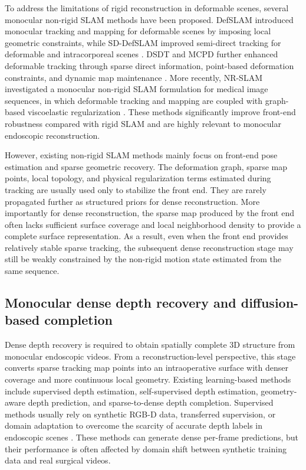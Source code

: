 \documentclass[pdflatex,sn-mathphys-num]{sn-jnl}
\begin{document}
To address the limitations of rigid reconstruction in deformable scenes, several monocular non-rigid SLAM methods have been proposed. DefSLAM introduced monocular tracking and mapping for deformable scenes by imposing local geometric constraints, while SD-DefSLAM improved semi-direct tracking for deformable and intracorporeal scenes \cite{bib5,bib6}. DSDT and MCPD further enhanced deformable tracking through sparse direct information, point-based deformation constraints, and dynamic map maintenance \cite{bib7,bib8}. More recently, NR-SLAM investigated a monocular non-rigid SLAM formulation for medical image sequences, in which deformable tracking and mapping are coupled with graph-based viscoelastic regularization \cite{bib9}. These methods significantly improve front-end robustness compared with rigid SLAM and are highly relevant to monocular endoscopic reconstruction.

However, existing non-rigid SLAM methods mainly focus on front-end pose estimation and sparse geometric recovery. The deformation graph, sparse map points, local topology, and physical regularization terms estimated during tracking are usually used only to stabilize the front end. They are rarely propagated further as structured priors for dense reconstruction. More importantly for dense reconstruction, the sparse map produced by the front end often lacks sufficient surface coverage and local neighborhood density to provide a complete surface representation. As a result, even when the front end provides relatively stable sparse tracking, the subsequent dense reconstruction stage may still be weakly constrained by the non-rigid motion state estimated from the same sequence.

\subsection{Monocular dense depth recovery and diffusion-based completion}

Dense depth recovery is required to obtain spatially complete 3D structure from monocular endoscopic videos. From a reconstruction-level perspective, this stage converts sparse tracking map points into an intraoperative surface with denser coverage and more continuous local geometry. Existing learning-based methods include supervised depth estimation, self-supervised depth estimation, geometry-aware depth prediction, and sparse-to-dense depth completion. Supervised methods usually rely on synthetic RGB-D data, transferred supervision, or domain adaptation to overcome the scarcity of accurate depth labels in endoscopic scenes \cite{bib10,bib11,bib12,bib13,bib14,bib15,bib16,bib17,bib18,bib19}. These methods can generate dense per-frame predictions, but their performance is often affected by domain shift between synthetic training data and real surgical videos.
\end{document}
